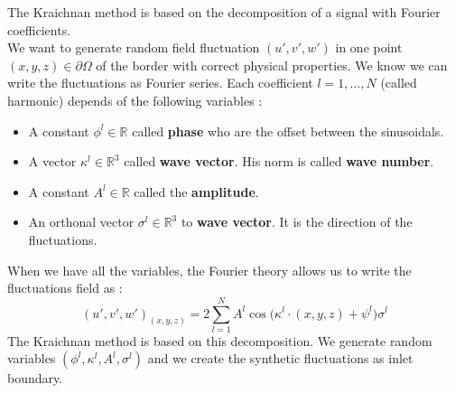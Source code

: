 The Kraichnan method is based on the decomposition of a signal with Fourier coefficients.\\
We want to generate random field fluctuation $(u',v',w')$ in one point $(x,y,z) \in \partial \Omega$ of the border with correct physical properties. We know we can write the fluctuations as Fourier series. Each coefficient $l = 1, \hdots, N$ (called harmonic) depends of the following variables :
\begin{itemize}
    \item A constant $\phi^l \in \mathbb{R}$ called \textbf{phase} who are the offset between the sinusoidals.
    \item A vector $\kappa^l \in \mathbb{R}^3$ called \textbf{wave vector}. His norm is called \textbf{wave number}.
    \item A constant $A^l \in \mathbb{R}$ called the \textbf{amplitude}.
    \item An orthonal vector $\sigma^l \in \mathbb{R}^3$ to \textbf{wave vector}. It is the direction of the fluctuations.
\end{itemize}
When we have all the variables, the Fourier theory allows us to write the fluctuations field as :
\[
(u',v',w')_{(x,y,z)} = 2\sum_{l=1}^{N} A^l \cos\big(\kappa^l \cdot (x,y,z)+ \psi^l \big) \sigma^l
\]
The Kraichnan method is based on this decomposition. We generate random variables $(\phi^l, \kappa^l, A^l, \sigma^l)$ and we create the synthetic fluctuations as inlet boundary. 

